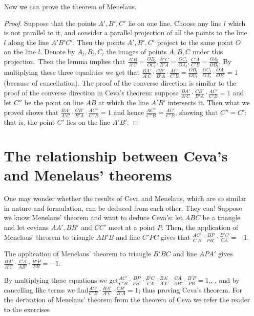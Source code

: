 Now we can prove the theorem of Menelaus.
\begin{proof}
Suppose that the points $A',B',C'$ lie on one line. Choose any line $l$ which is not parallel to it, and consider a parallel projection of all the points to the line $l$ along the line $A'B'C'$. Then the points $A',B',C'$ project to the same point $O$ on the line $l$. Denote by $A_l,B_l,C_l$ the images of points $A,B,C$ under this projection. Then the lemma implies that $\frac{A'B}{A'C}=\frac{OB_l}{OC_l},\frac{B'C}{B'A}=\frac{OC_l}{OA_l},\frac{C'A}{C'B}=\frac{OA_l}{OB_l}$. By multiplying these three equalities we get that $\frac{BA'}{A'C}\cdot\frac{CB'}{B'A}\cdot\frac{AC'}{C'B}=\frac{OB_l}{OC_l}\cdot\frac{OC_l}{OA_l}\cdot\frac{OA_l}{OB_l}=1$ (because of cancellation).
The proof of the converse direction is similar to the proof of the converse direction in Ceva's theorem: suppose $\frac{BA'}{A'C}\cdot\frac{CB'}{B'A}\cdot\frac{AC'}{C'B}=1$ and let $C''$ be the point on line $AB$ at which the line $A'B'$ intersects it. Then what we proved shows that $\frac{BA'}{A'C}\cdot\frac{CB'}{B'A}\cdot\frac{AC''}{C''B}=1$ and hence $\frac{AC''}{C''B}=\frac{AC'}{C'B}$, showing that $C''=C'$; that is, the point $C'$ lies on the line $A'B'$.
\end{proof}
\section{The relationship between Ceva's and Menelaus' theorems}
One may wonder whether the results of Ceva and Menelaus, which are so similar in nature and formulation, can be deduced from each other. They can! Suppose we know Menelaus' theorem and want to deduce Ceva's: let $ABC$ be a triangle and let cevians $AA',BB'$ and $CC'$ meet at a point $P$.
Then, the application of Menelaus' theorem to triangle $AB'B$ and line $C'PC$ gives that $\frac{AC'}{C'B}\cdot\frac{BP}{PB'}\cdot\frac{B'C}{CA}=-1$.

The application of Menelaus' theorem to triangle $B'BC$ and line $APA'$ gives $\frac{BA'}{A'C}\cdot\frac{CA}{AB'}\cdot\frac{B'P}{PB}=-1$.

By multiplying these equations we get$\frac{AC'}{C'B}\cdot\frac{BP}{PB'}\cdot\frac{B'C}{CA}\cdot\frac{BA'}{A'C}\cdot\frac{CA}{AB'}\cdot\frac{B'P}{PB}=1$,, , and by cancelling like terms we find$\frac{AC'}{C'B}\cdot\frac{BA'}{A'C}\cdot\frac{CB'}{B'A}=1$; thus proving Ceva's theorem.
For the derivation of Menelaus' theorem from the theorem of Ceva we refer the reader to the exercises
